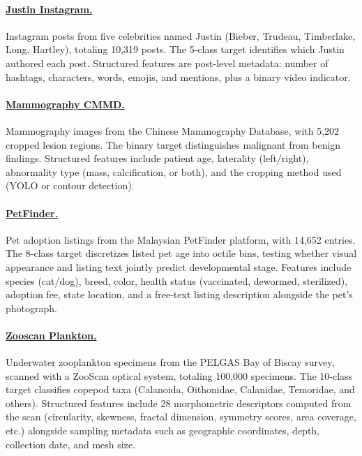 \documentclass{llmxive}
\begin{document}
\paragraph{\href{https://www.kaggle.com/datasets/aldiandyainf/which-justin-posted-that}{Justin Instagram.}} Instagram posts from five celebrities named Justin (Bieber, Trudeau, Timberlake, Long, Hartley), totaling 10,319 posts. The 5-class target identifies which Justin authored each post.
Structured features are post-level metadata: number of hashtags, characters, words, emojis, and mentions, plus a binary video indicator.

\paragraph{\href{https://www.kaggle.com/datasets/nguynththanhho/cmmd-mammography}{Mammography CMMD.}} Mammography images from the Chinese Mammography Database, with 5,202 cropped lesion regions.
The binary target distinguishes malignant from benign findings.
Structured features include patient age, laterality (left/right), abnormality type (mass, calcification, or both), and the cropping method used (YOLO or contour detection).

\paragraph{\href{https://www.kaggle.com/datasets/c/petfinder-adoption-prediction}{PetFinder.}} Pet adoption listings from the Malaysian PetFinder platform, with 14,652 entries.
The 8-class target discretizes listed pet age into octile bins, testing whether visual appearance and listing text jointly predict developmental stage.
Features include species (cat/dog), breed, color, health status (vaccinated, dewormed, sterilized), adoption fee, state location, and a free-text listing description alongside the pet's photograph.

\paragraph{\href{https://www.kaggle.com/datasets/raghavdharwal/pelgass-bay-of-biscay-zooscan-zooplankton-dataset}{Zooscan Plankton.}} Underwater zooplankton specimens from the PELGAS Bay of Biscay survey, scanned with a ZooScan optical system, totaling 100,000 specimens.
The 10-class target classifies copepod taxa (Calanoida, Oithonidae, Calanidae, Temoridae, and others).
Structured features include 28 morphometric descriptors computed from the scan (circularity, skewness, fractal dimension, symmetry scores, area coverage, etc.) alongside sampling metadata such as geographic coordinates, depth, collection date, and mesh size.
\end{document}
